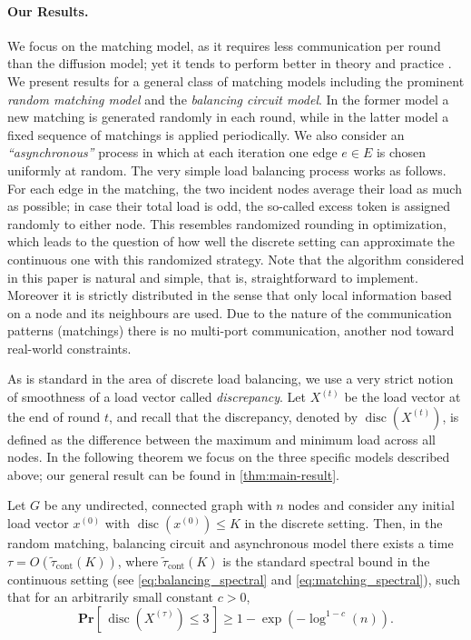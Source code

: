 \documentclass[twoside,leqno]{article}
\newcommand{\Pro}[1]{\mathbf{Pr} \left[\,#1\,\right]}
\DeclareMathOperator{\discr}{\mathrm{disc}}
\DeclareMathOperator{\1}{\mathbf{1}}
\newcommand{\tauspectral}[1]{{\widetilde{\tau}}_{\mathrm{cont}}\left({#1}\right)}
\numberwithin{equation}{section}
\begin{document}
\paragraph{Our Results.} We focus on the matching model, as it requires less communication per round than the diffusion model; yet it tends to perform better in theory and practice \cite{DBLP:conf/focs/RabaniSW98,DBLP:conf/focs/SauerwaldS12}. We present results for a general class of matching models including the prominent \emph{random matching model} and the \emph{balancing circuit model}. 
In the former model a new matching is generated randomly in each round, while in the latter model a fixed sequence of matchings is applied periodically. We also consider an \emph{``asynchronous''} process in which at each iteration one edge $e \in E$ is chosen uniformly at random.
The very simple load balancing process works as follows.
For each edge in the matching, the two incident nodes average their load as much as possible; in case their total load is odd, the so-called excess token is assigned randomly to either node. This resembles randomized rounding in optimization, which leads to the question of how well the discrete setting can approximate the continuous one with this randomized strategy. 
Note that the algorithm  considered in this paper is  natural and simple, that is, straightforward to implement. Moreover it is    strictly distributed in the sense that only local information based on a node and its neighbours are used. Due to the nature of the communication patterns (matchings) there is no multi-port communication, another nod toward real-world constraints. 

As is standard in the area of discrete load balancing, we use a very strict notion of smoothness of a load vector called \emph{discrepancy}. Let $X^{(t)}$ be the load vector at the end of round $t$, and recall that the discrepancy, denoted by $\discr(X^{(t)})$, is defined as the difference between the maximum and minimum load across all nodes.
In the following theorem we focus on the three specific models described above;
our general result can be found in \cref{thm:main-result}. 
\begin{theorem*}
Let $G$ be any undirected, connected graph with $n$ nodes and consider any initial load vector $x^{(0)}$ with $\discr(x^{(0)})\leq K$ in the discrete setting.
Then, in the random matching, balancing circuit and asynchronous model there exists a time $\tau=O(\tauspectral{K})$, where $\tauspectral{K}$ is the standard spectral bound in the continuous setting (see \cref{eq:balancing_spectral} and \cref{eq:matching_spectral}), such that for an arbitrarily small constant $c>0$,
\[
\Pro{ \discr\left(X^{(\tau)}\right) \leq 3} \ge 1 -\exp \left(-\log^{1-c}(n) \right).
\]
\end{theorem*}
\end{document}
